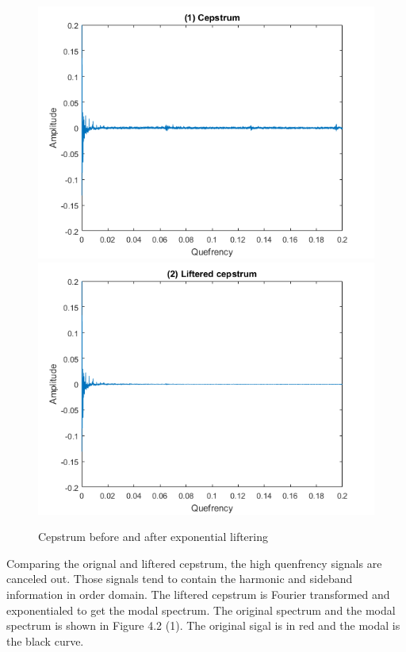 \begin{figure}[h]
	\centering
	\includegraphics[scale =0.48]{cepstrum}
	\includegraphics[scale =0.48]{lifteredCepstrum}
	\caption{Cepstrum before and after exponential liftering}
	\label{cepstrum}
\end{figure}

Comparing the orignal and liftered cepstrum, the high quenfrency signals are canceled out. Those signals tend to contain the harmonic and sideband information in order domain. The liftered cepstrum is Fourier transformed and exponentialed to get the modal spectrum. The original spectrum and the modal spectrum is shown in Figure 4.2 (1). The original sigal is in red and the modal is the black curve.

